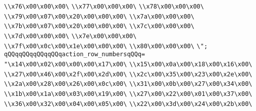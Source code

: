 \verb|\\x76\x00\x00\x00\|\newline
\verb|\\x77\x00\x00\x00\|\newline
\verb|\\x78\x00\x00\x00\|\newline
\verb|\\x79\x00\x07\x00\x20\x00\x00\x00\|\newline
\verb|\\x7a\x00\x00\x00\|\newline
\verb|\\x7b\x00\x07\x00\x20\x00\x00\x00\|\newline
\verb|\\x7c\x00\x00\x00\|\newline
\verb|\\x7d\x00\x00\x00\|\newline
\verb|\\x7e\x00\x00\x00\|\newline
\verb|\\x7f\x00\x0c\x00\x1e\x00\x00\x00\|\newline
\verb|\\x80\x00\x00\x00\|\newline
\verb|\";|\newline
\verb|qQQqqQQqqQQqqQQqaction_row_numbersqQQq=|\newline
\verb|"\x14\x00\x02\x00\x00\x00\x17\x00\|\newline
\verb|\\x15\x00\x0a\x00\x18\x00\x16\x00\|\newline
\verb|\\x27\x00\x46\x00\x2f\x00\x2d\x00\|\newline
\verb|\\x2c\x00\x35\x00\x23\x00\x2e\x00\|\newline
\verb|\\x2a\x00\x28\x00\x26\x00\x0c\x00\|\newline
\verb|\\x31\x00\x0b\x00\x27\x00\x34\x00\|\newline
\verb|\\x1b\x00\x1a\x00\x03\x00\x19\x00\|\newline
\verb|\\x27\x00\x22\x00\x01\x00\x37\x00\|\newline
\verb|\\x36\x00\x32\x00\x04\x00\x05\x00\|\newline
\verb|\\x22\x00\x3d\x00\x24\x00\x2b\x00\|\newline
